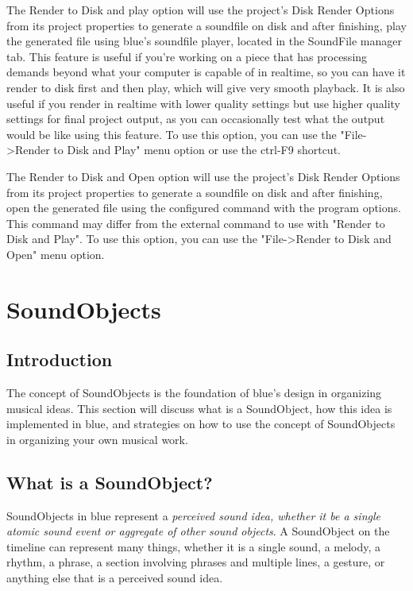 The Render to Disk and play option will use the project's Disk Render
Options from its project properties to generate a soundfile on disk and
after finishing, play the generated file using blue's soundfile player,
located in the SoundFile manager tab. This feature is useful if you're
working on a piece that has processing demands beyond what your computer
is capable of in realtime, so you can have it render to disk first and
then play, which will give very smooth playback. It is also useful if
you render in realtime with lower quality settings but use higher
quality settings for final project output, as you can occasionally test
what the output would be like using this feature. To use this option,
you can use the "File-\textgreater{}Render to Disk and Play" menu option
or use the ctrl-F9 shortcut.

The Render to Disk and Open option will use the project's Disk Render
Options from its project properties to generate a soundfile on disk and
after finishing, open the generated file using the configured command
with the program options. This command may differ from the external
command to use with "Render to Disk and Play". To use this option, you
can use the "File-\textgreater{}Render to Disk and Open" menu option.

\section{SoundObjects}\label{conceptsSoundObjects}

\subsection{Introduction}

The concept of SoundObjects is the foundation of blue's design in
organizing musical ideas. This section will discuss what is a
SoundObject, how this idea is implemented in blue, and strategies on how
to use the concept of SoundObjects in organizing your own musical work.

\subsection{What is a SoundObject?}

SoundObjects in blue represent a \emph{perceived sound idea, whether it
be a single atomic sound event or aggregate of other sound objects}. A
SoundObject on the timeline can represent many things, whether it is a
single sound, a melody, a rhythm, a phrase, a section involving phrases
and multiple lines, a gesture, or anything else that is a perceived
sound idea.

